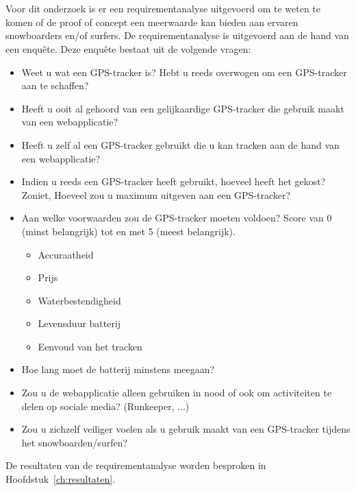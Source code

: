 \section{}
\label{ch:requirementAnalyse}
Voor dit onderzoek is er een requirementanalyse uitgevoerd om te weten te komen of de proof of concept een meerwaarde kan bieden aan ervaren snowboarders en/of surfers. De requirementanalyse is uitgevoerd aan de hand van een enquête. Deze enquête bestaat uit de volgende vragen:
\begin{itemize}
	\item Weet u wat een GPS-tracker is? Hebt u reeds overwogen om een GPS-tracker aan te schaffen?
	\item Heeft u ooit al gehoord van een gelijkaardige GPS-tracker die gebruik maakt van een webapplicatie?
	\item Heeft u zelf al een GPS-tracker gebruikt die u kan tracken aan de hand van een webapplicatie?
	\item Indien u reeds een GPS-tracker heeft gebruikt, hoeveel heeft het gekost? Zoniet, Hoeveel zou u maximum uitgeven aan een GPS-tracker?
	\item Aan welke voorwaarden zou de GPS-tracker moeten voldoen? Score van 0 (minst belangrijk) tot en met 5 (meest belangrijk).
	\begin{itemize}
		\item Accuraatheid
		\item Prijs
		\item Waterbestendigheid
		\item Levensduur batterij
		\item Eenvoud van het tracken
	\end{itemize}
	\item Hoe lang moet de batterij minstens meegaan?
	\item Zou u de webapplicatie alleen gebruiken in nood of ook om activiteiten te delen op sociale media? (Runkeeper, ...)
	\item Zou u zichzelf veiliger voelen als u gebruik maakt van een GPS-tracker tijdens het snowboarden/surfen?
\end{itemize}
De resultaten van de requirementanalyse worden besproken in Hoofdstuk~\ref{ch:resultaten}.


